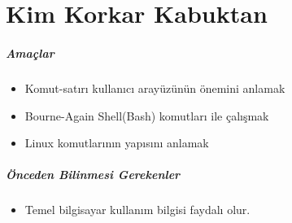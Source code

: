 \chapter{Kim Korkar Kabuktan}
\label{chap:bolum4}
\paragraph{Amaçlar}
\begin{itemize}
 \item Komut-satırı kullanıcı arayüzünün önemini anlamak
 \item Bourne-Again Shell(Bash) komutları ile çalışmak
 \item Linux komutlarının yapısını anlamak
 \end{itemize}
 
\paragraph{Önceden Bilinmesi Gerekenler}
\begin{itemize}
 \item Temel bilgisayar kullanım bilgisi faydalı olur.
 \end{itemize}

